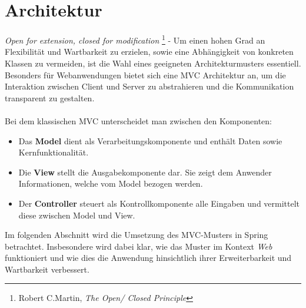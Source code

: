 \section{Architektur}

\textit{Open for extension, closed for modification} \footnote{Robert C.Martin, \textit{The Open/
Closed Principle}} - Um einen hohen Grad an Flexibilität und Wartbarkeit zu erzielen, sowie eine 
Abhängigkeit von konkreten Klassen zu vermeiden, ist die Wahl eines geeigneten Architekturmusters 
essentiell. Besonders für Webanwendungen bietet sich eine \ac{MVC} Architektur an, um die 
Interaktion zwischen Client und Server zu abstrahieren und die Kommunikation transparent zu gestalten.
\\\\
Bei dem klassischen \acs{MVC} unterscheidet man zwischen den Komponenten:
\begin{itemize}
  \item Das \textbf{Model} dient als Verarbeitungskomponente und enthält Daten sowie Kernfunktionalität.
  \item Die \textbf{View} stellt die Ausgabekomponente dar. Sie zeigt dem Anwender Informationen, welche vom Model bezogen werden.
  \item Der \textbf{Controller} steuert als Kontrollkomponente alle Eingaben und vermittelt diese zwischen Model und View.
\end{itemize}
Im folgenden Abschnitt wird die Umsetzung des \acs{MVC}-Musters in Spring betrachtet. Insbesondere wird 
dabei klar, wie das Muster im Kontext \textit{Web} funktioniert und wie dies die Anwendung hinsichtlich 
ihrer Erweiterbarkeit und Wartbarkeit verbessert.
